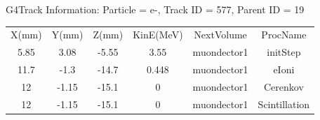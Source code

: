\documentclass[aps,prd,superscriptaddress,nofootinbib,preprint]{ctexart}
\begin{document}
\begin{CJK}{UTF8}{gbsn}
G4Track Information:   Particle = e-,   Track ID = 577,   Parent ID = 19\\

\begin{center}
\begin{tabular}{|c|c|c|c|c|c|}
X(mm)  &  Y(mm)  &  Z(mm) & KinE(MeV)  &  NextVolume & ProcName\\
5.85  & 3.08  &  -5.55    &  3.55    & muondector1  & initStep\\
11.7  &  -1.3 & -14.7    &   0.448    & muondector1 & eIoni\\
12 & -1.15 & -15.1   &    0   &  muondector1  & Cerenkov\\
 12  & -1.15  & -15.1    &   0     &  muondector1  & Scintillation

\end{tabular}
\end{center}

\end{CJK}
\end{document}

